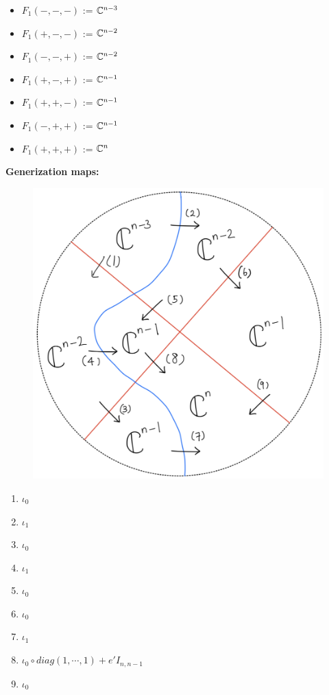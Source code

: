 \begin{itemize}
\item $F_1(-,-,-)$ := $\mathbb{C}^{n-3}$
\item $F_1(+,-,-)$ := $\mathbb{C}^{n-2}$
\item $F_1(-,-,+)$ := $\mathbb{C}^{n-2}$
\item $F_1(+,-,+)$ := $\mathbb{C}^{n-1}$
\item $F_1(+,+,-)$ := $\mathbb{C}^{n-1}$
\item $F_1(-,+,+)$ := $\mathbb{C}^{n-1}$
\item $F_1(+,+,+)$ := $\mathbb{C}^n$
\end{itemize}
\textbf{Generization maps:}
\begin{figure}[H]
    \centering
    \includegraphics[scale = 0.45]{diagrams/cobord'4/33.png}
    \caption{}
    \label{fig:your-label}
\end{figure}
\begin{enumerate}[label = (\arabic*)]
\item $\iota_0$

\item $\iota_1$

\item $\iota_0$

\item $\iota_1$

\item $\iota_0$

\item $\iota_0$

\item $\iota_1$

\item $\iota_0 \circ diag(1,\cdots,1) + e' I_{n,n-1}$

\item $\iota_0$
\end{enumerate}

